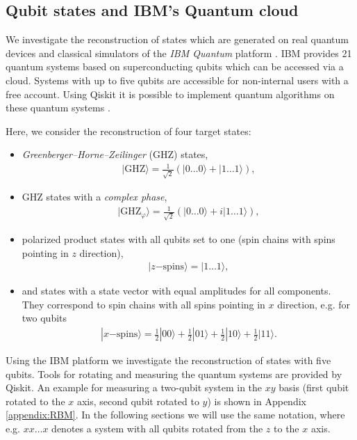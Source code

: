 \documentclass[pra,aps,showpacs,groupedaddress,superscriptaddress,twocolumn,toc=flat,biblatex,footinbib]{revtex4-1}
\newcommand{\ket}[1]{|#1\rangle}
\begin{document}
\subsection{Qubit states and IBM's Quantum cloud}

We investigate the reconstruction of states which are generated on real quantum devices and classical simulators of the \textit{IBM Quantum} platform \cite{IBM}. IBM provides 21 quantum systems based on superconducting qubits which can be accessed via a cloud. Systems with up to five qubits are accessible for non-internal users with a free account. Using Qiskit it is possible to implement quantum algorithms on these quantum systems \cite{Qiskit2010}.

Here, we consider the reconstruction of four target states:
\begin{itemize}
\item \textit{Greenberger–Horne–Zeilinger} (GHZ) states, 
    \begin{align}
    \ket{\mathrm{GHZ}} = \frac{1}{\sqrt{2}} \left(\ket{0\dots 0} + \ket{1\dots 1} \right),
    \label{eq:State1}
    \end{align} 
\item GHZ states with a \textit{complex phase}, 
    \begin{align}
    \ket{\mathrm{GHZ}_{\varphi}} = \frac{1}{\sqrt{2}} \left(\ket{0\dots 0} + i\ket{1\dots 1} \right),
    \label{eq:State1_phase}
    \end{align} 
\item polarized product states with all qubits set to one (spin chains with spins pointing in $z$ direction),
\begin{align}
    \ket{z\mathrm{-spins}} = \ket{1\dots 1},
    \label{eq:State2}
\end{align}
\item and states with a state vector with equal amplitudes for all components. They correspond to spin chains with all spins pointing in $x$ direction, e.g. for two qubits
\begin{align}
    \ket{x\mathrm{-spins}} = \frac{1}{2} \ket{00}+  \frac{1}{2} \ket{01} +  \frac{1}{2}   \ket{10} +  \frac{1}{2}  \ket{11}.
    \label{eq:State3}
\end{align}
\end{itemize}

Using the IBM platform we investigate the reconstruction of states with five qubits. Tools for rotating and measuring the quantum systems are provided by Qiskit. An example for measuring a two-qubit system in the $xy$ basis (first qubit rotated to the $x$ axis, second qubit rotated to $y$) is shown in Appendix \ref{appendix:RBM}. In the following sections we will use the same notation, where e.g. $xx\dots x$ denotes a system with all qubits rotated from the $z$ to the $x$ axis.
\end{document}
